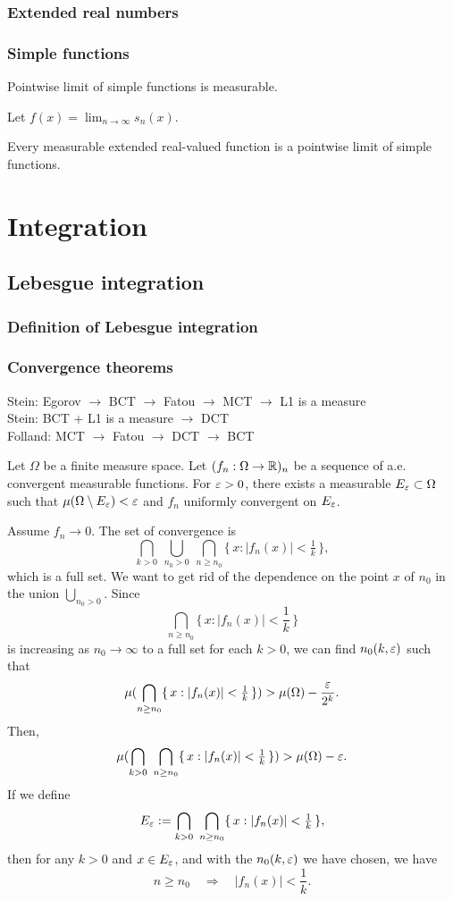 \documentclass{../note}
\begin{document}
\section{Extended real numbers}


\section{Simple functions}
Pointwise limit of simple functions is measurable.
\begin{pf}
Let $f(x)=\lim_{n\to\infty}s_n(x)$.

\end{pf}

Every measurable extended real-valued function is a pointwise limit of simple functions.



\part{Integration}

\chapter{Lebesgue integration}
\section{Definition of Lebesgue integration}
\section{Convergence theorems}

Stein: Egorov $\to$ BCT $\to$ Fatou $\to$ MCT $\to$ L1 is a measure\\
Stein: BCT + L1 is a measure $\to$ DCT\\
Folland: MCT $\to$ Fatou $\to$ DCT $\to$ BCT




\begin{prb}
Let $\Omega$ be a finite measure space.
Let $(f_n:\Omega\to\mathbb{R})_n$ be a sequence of a.e. convergent measurable functions.
For $\varepsilon>0$, there exists a measurable $E_\varepsilon\subset\Omega$ such that $\mu(\Omega\setminus E_\varepsilon)<\varepsilon$ and $f_n$ uniformly convergent on $E_\varepsilon$.
\end{prb}
\begin{pf}
Assume $f_n\to0$.
The set of convergence is
\[\bigcap_{k>0}\ \bigcup_{n_0>0}\ \bigcap_{n\ge n_0}\{\,x:|f_n(x)|<\tfrac1k\,\},\]
which is a full set.
We want to get rid of the dependence on the point $x$ of $n_0$ in the union $\bigcup_{n_0>0}$.
Since
\[\bigcap_{n\ge n_0}\{\,x:|f_n(x)|<\frac1k\,\}\]
is increasing as $n_0\to\infty$ to a full set for each $k>0$, we can find $n_0(k,\varepsilon)$ such that
\[\mu(\bigcap_{n\ge n_0}\{\,x:|f_n(x)|<\tfrac1k\,\})>\mu(\Omega)-\frac{\varepsilon}{2^k}.\]
Then,
\[\mu(\bigcap_{k>0}\ \bigcap_{n\ge n_0}\{\,x:|f_n(x)|<\tfrac1k\,\})>\mu(\Omega)-\varepsilon.\]
If we define
\[E_\e:=\bigcap_{k>0}\ \bigcap_{n\ge n_0}\{\,x:|f_n(x)|<\tfrac1k\,\},\]
then for any $k>0$ and $x\in E_\varepsilon$, and with the $n_0(k,\varepsilon)$ we have chosen,
we have
\[n\ge n_0\quad\Rightarrow\quad |f_n(x)|<\frac1k.\]
\end{pf}
\end{document}
